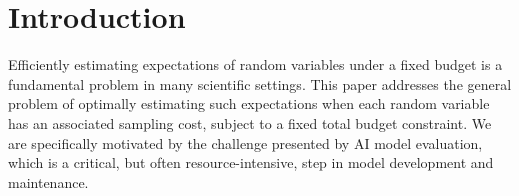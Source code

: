 \documentclass{article} %
\begin{document}
\begin{abstract}

\end{abstract}

\section{Introduction}
\label{sec:intro}

Efficiently estimating expectations of random variables under a fixed budget is a fundamental problem in many scientific settings. This paper addresses the general problem of optimally estimating such expectations when each random variable has an associated sampling cost, subject to a fixed total budget constraint. We are specifically motivated by the challenge presented by AI model evaluation, which is a critical, but often resource-intensive, step in model development and maintenance. %
\end{document}
